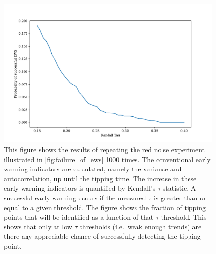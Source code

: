 \begin{figure}
  \centering
  \includegraphics[width=\textwidth]{pofsuccess}
  \caption[Probability of detection for conventional early warning signals]{
    This figure shows the results of repeating the red noise experiment illustrated in \cref{fig:failure_of_ews} 1000 times.
    The conventional early warning indicators are calculated, namely the variance and autocorrelation, up until the tipping time.
    The increase in these early warning indicators is quantified by Kendall's $\tau$ statistic. 
    A successful early warning occurs if the measured $\tau$ is greater than or equal to a given threshold. The figure shows the fraction
    of tipping points that will be identified as a function of that $\tau$ threshold.
    This shows that only at low $\tau$ thresholds (i.e.\ weak enough trends) are there any appreciable
  chance of successfully detecting the tipping point.}
  \label{fig:prob_of_suc}
\end{figure}


